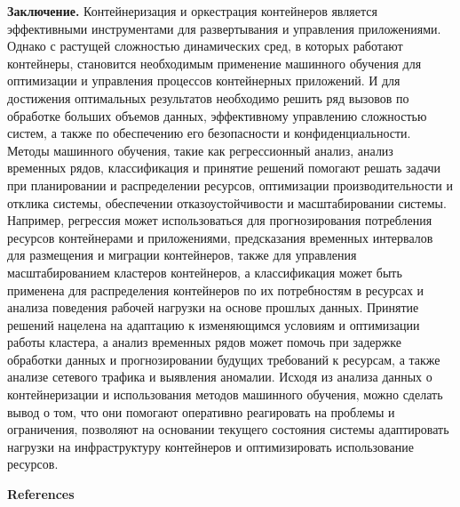 \textbf{Заключение.} Контейнеризация и оркестрация контейнеров является
эффективными инструментами для развертывания и управления приложениями.
Однако с растущей сложностью динамических сред, в которых работают
контейнеры, становится необходимым применение машинного обучения для
оптимизации и управления процессов контейнерных приложений. И для
достижения оптимальных результатов необходимо решить ряд вызовов по
обработке больших объемов данных, эффективному управлению сложностью
систем, а также по обеспечению его безопасности и конфиденциальности.
Методы машинного обучения, такие как регрессионный анализ, анализ
временных рядов, классификация и принятие решений помогают решать задачи
при планировании и распределении ресурсов, оптимизации
производительности и отклика системы, обеспечении отказоустойчивости и
масштабировании системы. Например, регрессия может использоваться для
прогнозирования потребления ресурсов контейнерами и приложениями,
предсказания временных интервалов для размещения и миграции контейнеров,
также для управления масштабированием кластеров контейнеров, а
классификация может быть применена для распределения контейнеров по их
потребностям в ресурсах и анализа поведения рабочей нагрузки на основе
прошлых данных. Принятие решений нацелена на адаптацию к изменяющимся
условиям и оптимизации работы кластера, а анализ временных рядов может
помочь при задержке обработки данных и прогнозировании будущих
требований к ресурсам, а также анализе сетевого трафика и выявления
аномалии. Исходя из анализа данных о контейнеризации и использования
методов машинного обучения, можно сделать вывод о том, что они помогают
оперативно реагировать на проблемы и ограничения, позволяют на основании
текущего состояния системы адаптировать нагрузки на инфраструктуру
контейнеров и оптимизировать использование ресурсов.

\textbf{References}

